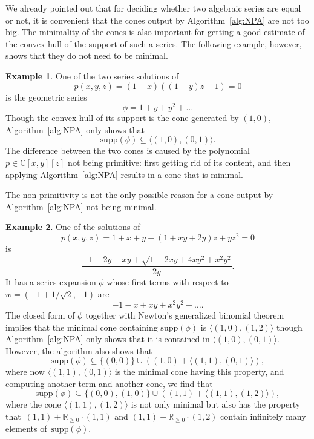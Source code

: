 \documentclass[a4paper,draft]{amsart}
\theoremstyle{definition}
\newtheorem{Example}{Example}
\begin{document}
We already pointed out that for deciding whether two algebraic series are equal or not, it is convenient that the cones output by Algorithm~\ref{alg:NPA} are not too big. The minimality of the cones is also important for getting a good estimate of the convex hull of the support of such a series. The following example, however, shows that they do not need to be minimal.
\begin{Example}
One of the two series solutions of 
 \begin{equation*}
  p(x,y,z) = (1-x)((1-y)z-1) = 0 
 \end{equation*}
is the geometric series 
\begin{equation*}
  \phi = 1 + y + y^2 + \dots  
\end{equation*}
Though the convex hull of its support is the cone generated by $(1,0)$, Algorithm~\ref{alg:NPA} only shows that 
\begin{equation*}
 \mathrm{supp}(\phi) \subseteq \langle (1,0), (0,1) \rangle.
\end{equation*}
The difference between the two cones is caused by the polynomial~$p\in\mathbb{C}[x,y][z]$ not being primitive: first getting rid of its content, and then applying Algorithm~\ref{alg:NPA} results in a cone that is minimal. 
\end{Example}
The non-primitivity is not the only possible reason for a cone output by Algorithm~\ref{alg:NPA} not being minimal.

\begin{Example}\label{ex:minimal0}
One of the solutions of 
\begin{equation*}
 p(x,y,z )= 1+x+y + (1 + xy +2y)z +yz^2 = 0
\end{equation*}
is
\begin{equation*}
 \frac{-1-2y-xy + \sqrt{1-2xy+4xy^2+x^2y^2}}{2y}.
\end{equation*}
It has a series expansion $\phi$ whose first terms with respect to $w = (-1+1/\sqrt{2},-1)$ are
\begin{equation*}
-1-x+xy+x^2y^2 + \dots. 
\end{equation*}
The closed form of $\phi$ together with Newton's generalized binomial theorem implies that the minimal cone containing $\mathrm{supp}(\phi)$ is $\langle (1,0), (1,2) \rangle$ though Algorithm~\ref{alg:NPA} only shows that it is contained in $\langle (1,0), (0,1) \rangle$. However, the algorithm also shows that
\begin{equation*}
 \mathrm{supp}(\phi) \subseteq \{(0,0)\} \cup \left( (1,0) + \langle (1,1), (0,1)\rangle \right),
\end{equation*}
where now $\langle (1,1), (0,1)\rangle$ is the minimal cone having this property, and computing another term and another cone, we find that
\begin{equation*}
 \mathrm{supp}(\phi) \subseteq \{(0,0), (1,0)\} \cup ((1,1) + \langle (1,1), (1,2) \rangle), 
\end{equation*}
where the cone $\langle (1,1), (1,2) \rangle$ is not only minimal but also has the property that~$(1,1)+\mathbb{R}_{\geq 0}\cdot (1,1)$ and $(1,1) + \mathbb{R}_{\geq 0}\cdot (1,2)$ contain infinitely many elements of~$\mathrm{supp}(\phi)$.
\end{Example}
\end{document}
